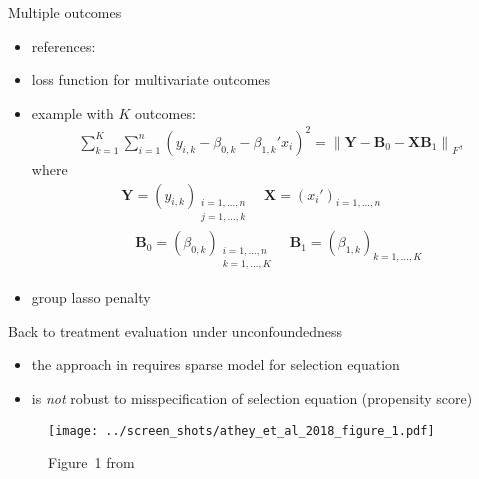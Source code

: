 \documentclass[xcolor=dvipsnames, handout]{beamer}
\begin{document}
\begin{frame}{Multiple outcomes}
\begin{itemize}
  \item references: \textcite{breiman1997predicting,turlach2005simultaneous,simila2007input,sofer2014variable}
  \item loss function for multivariate outcomes
  \item example with $K$ outcomes:
  \begin{align*}
    \sum_{k = 1}^K \sum_{i=1}^n \left(y_{i,k} - \beta_{0,k} - \beta_{1,k}'x_{i}\right)^2 
    = \left\lVert 
      \mathbf{Y} - \mathbf{B}_0 - \mathbf{X} \mathbf{B}_1
    \right\rVert_F, 
  \end{align*}
  where 
  \begin{align*}
    \mathbf{Y} = \left(y_{i,k}\right)_{\substack{i=1, \dotsc, n\\j=1, \dotsc, k}}
    \quad 
    \mathbf{X} = \left(x_{i}'\right)_{i=1, \dotsc, n}  
  \\
    \quad
    \mathbf{B}_0 = \left(\beta_{0,k}\right)_{\substack{i = 1, \dotsc,n \\k=1, \dotsc, K}}
    \quad
    \mathbf{B}_1 = \left(\beta_{1,k}\right)_{k=1, \dotsc, K}
  \end{align*}
  \item group lasso penalty
\end{itemize}
\end{frame}

\begin{frame}{Back to treatment evaluation under unconfoundedness}
\begin{itemize}[<+->]
  \item the approach in \textcite{belloni2014inference} requires sparse model for selection equation 
  \item is \emph{not} robust to misspecification of selection equation (propensity score)
\end{itemize}
\end{frame}

\begin{frame}
\begin{figure}
  \texttt{[image: ../screen\_shots/athey\_et\_al\_2018\_figure\_1.pdf]}
   \caption{Figure~1 from \textcite{athey2018approximate}}
\end{figure}
\end{frame}
\end{document}
